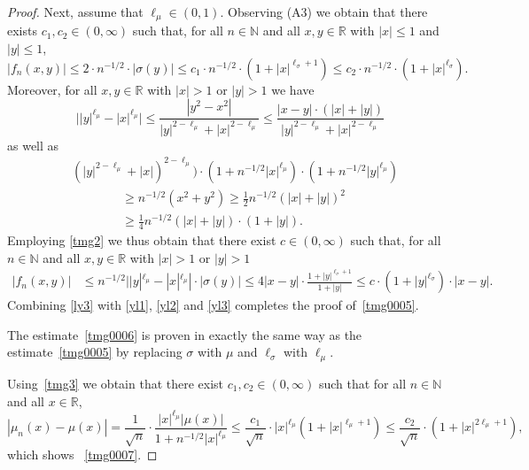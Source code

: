 \documentclass[11pt]{amsart}
\newcommand{\R}{{\mathbb R}}
\newcommand{\N}{{\mathbb N}}
\theoremstyle{plain}
\theoremstyle{definition}
\begin{document}
\begin{proof}
Next, assume that $\ell_\mu\in(0, 1)$. Observing (A3)   we obtain that  there  exists $c_1,c_2\in(0, \infty)$ such that, for all $n\in\N$ and all $x,y\in\R$ with $|x|\leq 1$ and $|y|\leq 1$,
\begin{equation}\label{yl2}
|f_n(x,y)|\leq 2\cdot n^{-1/2}\cdot |\sigma(y)| \le c_1\cdot n^{-1/2}\cdot (1+|x|^{\ell_\sigma+1}) \le c_2\cdot n^{-1/2}\cdot (1+|x|^{\ell_\sigma}).
\end{equation}
Moreover, for all $x,y\in\R$ with $|x|> 1$ or $|y|> 1$ we have
\[
\bigl||y|^{\ell_\mu}-|x|^{\ell_\mu}\bigr|\leq \frac{|y^{2}-x^{2}|}{|y|^{2-\ell_\mu}+|x|^{2-\ell_\mu}}\leq\frac{|x-y|\cdot (|x|+|y|)}{|y|^{2-\ell_\mu}+|x|^{2-\ell_\mu}}
\]
as well as
\begin{align*}
&(|y|^{2-\ell_\mu}+|x|)^{2-\ell_\mu})\cdot (1+n^{-1/2}|x|^{\ell_\mu})\cdot (1+n^{-1/2}|y|^{\ell_\mu})\\
&\qquad\qquad\geq n^{-1/2}(x^2+y^2)\geq \frac{1}{2}n^{-1/2}(|x|+|y|)^2\\
& \qquad\qquad \geq \frac{1}{4}n^{-1/2}(|x|+|y|)\cdot(1+|y|).
\end{align*}
Employing \eqref{tmg2} we thus obtain  that there  exist $c\in(0, \infty)$ such that, for all $n\in\N$ and all $x,y\in\R$ with $|x|> 1$ or $|y|> 1$
\begin{equation}\label{yl3}
	\begin{aligned}
|f_n(x,y)| & \leq n^{-1/2}||y|^{\ell_\mu}-|x|^{\ell_\mu}|\cdot |\sigma(y)|\le 4 |x-y| \cdot\frac{ 1+|y|^{\ell_\sigma+1}}{1+|y|} \leq c\cdot (1+|y|^{\ell_\sigma})\cdot |x-y|.
\end{aligned}
\end{equation}
Combining \eqref{ly3} with \eqref{yl1}, \eqref{yl2} and \eqref{yl3}  completes the proof of~\eqref{tmg0005}.

The estimate~\eqref{tmg0006} is proven in exactly the same way as the estimate~\eqref{tmg0005} by replacing $\sigma$ with $\mu$ and $\ell_\sigma$ with $\ell_\mu$.

Using~\eqref{tmg3} we obtain that there exist $c_1,c_2\in (0,\infty)$ such that for all $n\in\N$ and all $x\in \R$,
\[
|\mu_n(x)-\mu(x)| = \frac{1}{\sqrt{n}}\cdot  \frac{|x|^{\ell_\mu} |\mu(x)|}{1+n^{-1/2}|x|^{\ell_\mu}} \le  \frac{c_1}{\sqrt{n}}\cdot |x|^{\ell_\mu} (1+|x|^{\ell_\mu+1}) \le  \frac{c_2}{\sqrt{n}}\cdot  (1+|x|^{2\ell_\mu+1}),
\]
which shows ~\eqref{tmg0007}.


\end{proof}
\end{document}

